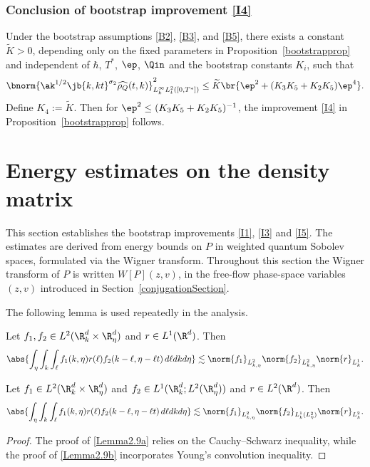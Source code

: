 \subsubsection*{Conclusion of bootstrap improvement \eqref{I4}}
Under the bootstrap assumptions \eqref{B2}, \eqref{B3}, and \eqref{B5}, there exists a constant $\widetilde K>0$, depending only on the fixed parameters in Proposition~\ref{bootstrapprop} and independent of $\hbar$, $T^*$, $\ep$, $\Qin$ and the bootstrap constants $K_i$, such that
\begin{align*}
\bnorm{\ak^{1/2}\jb{k,kt}^{\sigma_2}\widehat{\rho_Q}(t,k)}_{L^\infty_kL^2_{t}([0,T^*])}^2\leq \widetilde K\br{\ep^2+(K_3K_5+K_2K_5)\ep^4}.
\end{align*} Define $K_4:=\widetilde K$. Then for $\ep^2\leq(K_3K_5+K_2K_5)^{-1}$, the improvement \eqref{I4} in Proposition~\ref{bootstrapprop} follows.

\section{Energy estimates on the density matrix}\label{sectiondensitymatrix}
This section establishes the bootstrap improvements \eqref{I1}, \eqref{I3} and \eqref{I5}. The estimates are derived from energy bounds on \( P \) in weighted quantum Sobolev spaces, formulated via the Wigner transform. Throughout this section the Wigner transform of $P$ is written $W[P](z,v)$, in the free-flow phase-space variables $(z,v)$ introduced in Section~\ref{conjugationSection}.

The following lemma is used repeatedly in the analysis.
\begin{lemma}\label{Lemma2.9}
\leavevmode
\begin{enumeratea}
\item \label{Lemma2.9a}Let $f_{1},f_{2}\in L^2(\R^d_k\times\R_\eta^d)$ and $r\in L^1(\R^d)$. Then
\begin{align*}
\abs{\int_\eta\int_k\int_\ell f_1(k,\eta)r(\ell )f_2(k-\ell ,\eta-\ell t)\,d\ell dk d\eta}\lesssim\norm{f_1}_{L^2_{k,\eta}}\norm{f_2}_{L^2_{k,\eta}}\norm{r}_{L^1_k}.
\end{align*}
\item \label{Lemma2.9b}Let $f_1\in L^2(\R^d_k\times\R^d_\eta)$ and $f_2\in L^1(\R^d_k;L^2(\R^d_\eta))$ and $r\in L^2(\R^d)$. Then
\begin{align*}
\abs{\int_\eta\int_k\int_\ell f_1(k,\eta)r(\ell )f_2(k-\ell ,\eta-\ell t)\,d\ell dkd\eta}\lesssim\norm{f_1}_{L^2_{k,\eta}}\norm{f_2}_{L^1_k(L^2_\eta)}\norm{r}_{L^2_k}.
\end{align*}
\end{enumeratea}
\end{lemma}
\begin{proof}
The proof of \eqref{Lemma2.9a} relies on the Cauchy--Schwarz inequality, while the proof of \eqref{Lemma2.9b} incorporates Young's convolution inequality.
\end{proof}

